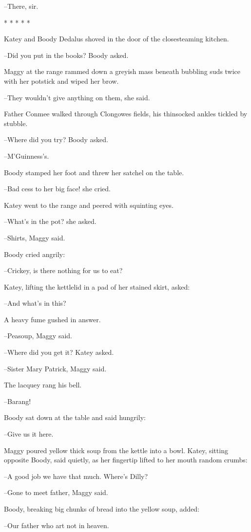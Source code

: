 --There, sir.


    * * * * *


Katey and Boody Dedalus shoved in the door of the closesteaming
kitchen.

--Did you put in the books? Boody asked.

Maggy at the range rammed down a greyish mass beneath bubbling
suds twice with her potstick and wiped her brow.

--They wouldn't give anything on them, she said.

Father Conmee walked through Clongowes fields, his thinsocked
ankles tickled by stubble.

--Where did you try? Boody asked.

--M'Guinness's.

Boody stamped her foot and threw her satchel on the table.

--Bad cess to her big face! she cried.

Katey went to the range and peered with squinting eyes.

--What's in the pot? she asked.

--Shirts, Maggy said.

Boody cried angrily:

--Crickey, is there nothing for us to eat?

Katey, lifting the kettlelid in a pad of her stained skirt, asked:

--And what's in this?

A heavy fume gushed in answer.

--Peasoup, Maggy said.

--Where did you get it? Katey asked.

--Sister Mary Patrick, Maggy said.

The lacquey rang his bell.

--Barang!

Boody sat down at the table and said hungrily:

--Give us it here.

Maggy poured yellow thick soup from the kettle into a bowl. Katey,
sitting opposite Boody, said quietly, as her fingertip lifted to her mouth
random crumbs:

--A good job we have that much. Where's Dilly?

--Gone to meet father, Maggy said.

Boody, breaking big chunks of bread into the yellow soup, added:

--Our father who art not in heaven.

